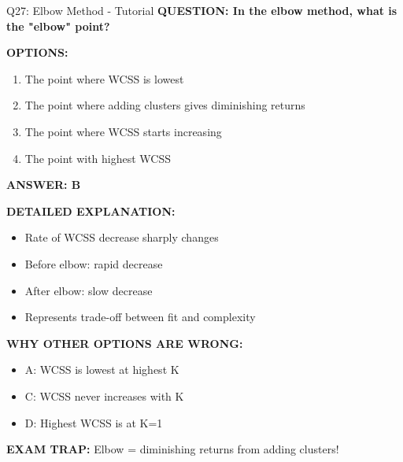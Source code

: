 \documentclass[8pt]{beamer}
\begin{document}
	\begin{frame}{Q27: Elbow Method - Tutorial}
		\fontsize{6.5}{7.5}\selectfont
		\textbf{QUESTION: In the elbow method, what is the "elbow" point?}
		
		\vspace{0.1cm}
		\textbf{OPTIONS:}
		\begin{enumerate}
			\item The point where WCSS is lowest
			\item The point where adding clusters gives diminishing returns
			\item The point where WCSS starts increasing
			\item The point with highest WCSS
		\end{enumerate}
		
		\vspace{0.1cm}
		\textcolor{myblue}{\textbf{ANSWER: B}}
		
		\vspace{0.1cm}
		\textbf{DETAILED EXPLANATION:}
		\begin{itemize}
			\item Rate of WCSS decrease sharply changes
			\item Before elbow: rapid decrease
			\item After elbow: slow decrease
			\item Represents trade-off between fit and complexity
		\end{itemize}
		
		\vspace{0.1cm}
		\textcolor{myred}{\textbf{WHY OTHER OPTIONS ARE WRONG:}}
		\begin{itemize}
			\item \textcolor{myred}{A:} WCSS is lowest at highest K
			\item \textcolor{myred}{C:} WCSS never increases with K
			\item \textcolor{myred}{D:} Highest WCSS is at K=1
		\end{itemize}
		
		\textcolor{myred}{\textbf{EXAM TRAP:}} Elbow = \textcolor{myblue}{diminishing returns from adding clusters}!
	\end{frame}
	
\end{document}
